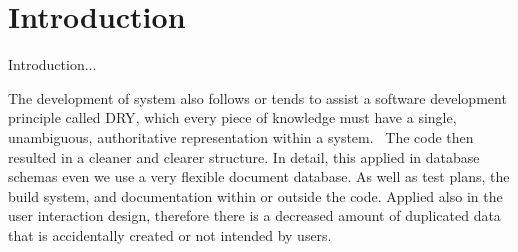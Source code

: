\chapter{Introduction}
\label{chap:introduction}

Introduction...


The development of system also follows or tends to assist a software development principle called \ac{DRY},
which every piece of knowledge must have a single, unambiguous, authoritative representation within a system.~\autocite{Hunt1999Pragmatic}
The code then resulted in a cleaner and clearer structure.
In detail, this applied in database schemas even we use a very flexible document database.
As well as test plans, the build system, and documentation within or outside the code.
Applied also in the user interaction design, therefore there is a decreased amount of duplicated data that is accidentally created or not intended by users.


